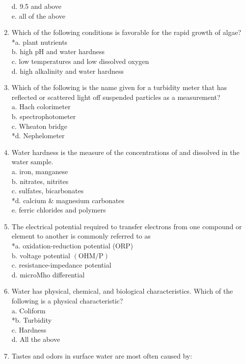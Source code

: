 \begin{enumerate}[1.]
d. 9.5 and above\\
e. all of the above\\
\item Which of the following conditions is favorable for the rapid growth of algae?\\
*a. plant nutrients\\
b. high pH and water hardness\\
c. low temperatures and low dissolved oxygen\\
d. high alkalinity and water hardness\\
\item Which of the following is the name given for a turbidity meter that has reflected or scattered light off suspended particles as a measurement?\\
a. Hach colorimeter\\
b. spectrophotometer\\
c. Wheaton bridge\\
*d. Nephelometer\\
\item Water hardness is the measure of the concentrations of and dissolved in the water sample.\\
a. iron, manganese\\
b. nitrates, nitrites\\
c. sulfates, bicarbonates\\
*d. calcium \& magnesium carbonates\\
e. ferric chlorides and polymers\\
\item The electrical potential required to transfer electrons from one compound or element to another is commonly referred to as\\
*a. oxidation-reduction potential (ORP)\\
b. voltage potential $(\mathrm{OHM} / \mathrm{P})$\\
c. resistance-impedance potential\\
d. microMho differential\\
\item Water has physical, chemical, and biological characteristics. Which of the following is a physical characteristic?\\
a. Coliform\\
*b. Turbidity\\ 
c. Hardness\\
d. All the above\\
\item Tastes and odors in surface water are most often caused by:\\

\end{enumerate}
